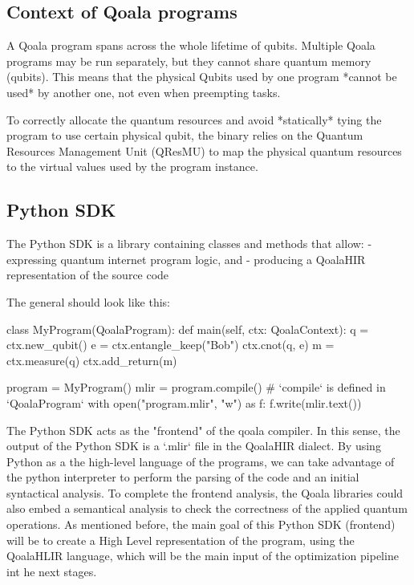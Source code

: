 \subsection{Context of Qoala programs}
A Qoala program spans across the whole lifetime of qubits.
Multiple Qoala programs may be run separately, but they cannot share quantum memory (qubits).
This means that the physical Qubits used by one program *cannot be used* by another one, not
even when preempting tasks.

To correctly allocate the quantum resources and avoid *statically* tying the program to use
certain physical qubit, the binary relies on the Quantum Resources Management Unit (QResMU) to map
the physical quantum resources to the virtual values used by the program instance.


\subsection{Python SDK}
The Python SDK is a library containing classes and methods that allow:
- expressing quantum internet program logic, and
- producing a QoalaHIR representation of the source code

The general should look like this:

\begin{pycode}
class MyProgram(QoalaProgram):
    def main(self, ctx: QoalaContext):
        q = ctx.new_qubit()
        e = ctx.entangle_keep("Bob")
        ctx.cnot(q, e)
        m = ctx.measure(q)
        ctx.add_return(m)

program = MyProgram()
mlir = program.compile()  # `compile` is defined in `QoalaProgram`
with open("program.mlir", "w") as f:
    f.write(mlir.text())
\end{pycode}

The Python SDK acts as the "frontend" of the qoala compiler. In this sense,
the output of the Python SDK is a `.mlir` file in the QoalaHIR dialect.
By using Python as a the high-level language of the programs, we can take advantage
of the python interpreter to perform the parsing of the code and an initial
syntactical analysis.
To complete the frontend analysis, the Qoala libraries could also embed a
semantical analysis to check the correctness of the applied quantum operations.
As mentioned before, the main goal of this Python SDK (frontend) will be to
create a High Level representation of the program, using the QoalaHLIR
language, which will be the main input of the optimization pipeline int he next stages.


